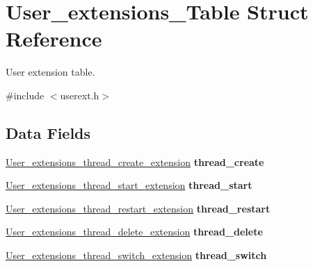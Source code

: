 \hypertarget{structUser__extensions__Table}{}\section{User\+\_\+extensions\+\_\+\+Table Struct Reference}
\label{structUser__extensions__Table}


User extension table.  




{\ttfamily \#include $<$userext.\+h$>$}

\subsection*{Data Fields}
\begin{DoxyCompactItemize}
\item 
\mbox{\label{structUser__extensions__Table_a20e0db81edbab4b099ceeaa6f69ce82a}} 
\mbox{\hyperlink{group__RTEMSScoreUserExt_gaa1841550f1837f2119ce895ad1b06861}{User\+\_\+extensions\+\_\+thread\+\_\+create\+\_\+extension}} {\bfseries thread\+\_\+create}
\item 
\mbox{\label{structUser__extensions__Table_af232205ca99b37d97ef0818e38ff8b43}} 
\mbox{\hyperlink{group__RTEMSScoreUserExt_ga4924b5a161503c73ac1c894561fdd2b5}{User\+\_\+extensions\+\_\+thread\+\_\+start\+\_\+extension}} {\bfseries thread\+\_\+start}
\item 
\mbox{\label{structUser__extensions__Table_a54ac7404038836f190c32e1bb18e9a5c}} 
\mbox{\hyperlink{group__RTEMSScoreUserExt_ga2f53589bea8c67fd0f1fef2d2115479c}{User\+\_\+extensions\+\_\+thread\+\_\+restart\+\_\+extension}} {\bfseries thread\+\_\+restart}
\item 
\mbox{\label{structUser__extensions__Table_ab77c4fa86d65e5ced325ccea8a0603c4}} 
\mbox{\hyperlink{group__RTEMSScoreUserExt_gac18e876b733325cf488b33a4a1c94558}{User\+\_\+extensions\+\_\+thread\+\_\+delete\+\_\+extension}} {\bfseries thread\+\_\+delete}
\item 
\mbox{\label{structUser__extensions__Table_af877dadee65b9df0304a7f9603b22f80}} 
\mbox{\hyperlink{group__RTEMSScoreUserExt_gac8250042e8749b455941bf4085d09fc5}{User\+\_\+extensions\+\_\+thread\+\_\+switch\+\_\+extension}} {\bfseries thread\+\_\+switch}

\end{DoxyCompactItemize}
